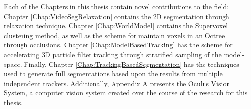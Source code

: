 Each of the Chapters in this thesis contain novel contributions to the field: Chapter \ref{Chap:VideoSegRelaxation} contains the 2D segmentation through relaxation technique. Chapter \ref{Chap:WorldModel} contains the Supervoxel clustering method, as well as the scheme for maintain voxels in an Octree through occlusions. Chapter \ref{Chap:ModelBasedTracking} has the scheme for accelerating 3D particle filter tracking through stratified sampling of the model-space. Finally, Chapter \ref{Chap:TrackingBasedSegmentation} has the techniques used to generate full segmentations based upon the results from multiple independent trackers. Additionally, Appendix A presents the Oculus Vision System, a computer vision system created over the course of the research for this thesis.